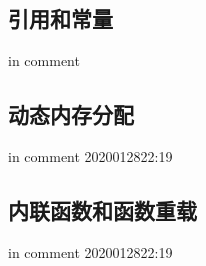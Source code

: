\documentclass[UTF8]{article}
\begin{document}
\subsection{引用和常量}
in comment
\begin{comment}
const int MAX_VAL = 23;
const double Pi = 3.14;
const char * schol_name = "mit";

1）不能通过const指针修改其所指向的内容；
2）常量指针不能赋值给非常量指针，除非强制类型转换(int *),反过来可以。
3）函数中const能防止参数指针指向的地方的数据被修改
void MyPrintf( const char *p){
    strcpy(p," by QR");//编译应该会出错
    printf("%
}

\end{comment}

\subsection{动态内存分配}
in comment
2020012822:19
\begin{comment}

malloc库
P = new T;
T是任意类型名，P是T*的指针，是动态分配出sizeof(T)的内存空间的起始地址。
int *pnew;
pnew = new int;
*pnew = 5;
delete pnew;

P = new T[n];
n是元素个数或者整数表达式
int *p;
int n = 6;
pnew = new int[n * 20];
pnew[0] = 20;
pnew[100] = 30;//编译没问题，运行会数组越界。
delete []pnew;

int *pnew = new int;

delete pnew; // 释放。delete 跟的指针要是一片动态空间
不释放的空间在程序运行期间会一直占用。


int *pnew = new int; *pnew = 5; delete pnew;
int *p_ = new int[6]; *p_[0] = 6; delete [] p_;

\end{comment}



\subsection{内联函数和函数重载}
in comment
2020012822:19
\begin{comment}
减少函数调用的开销，编译时把函数插入到调用语句处。exe文件大
inline int max(int a, int b){
    if (a>b) return a;
    return b;
}
小的函数，调用时和执行过程产生的开销差不多。
函数名相同， 参数个数和类型不同叫参数重载,c++可以名字相同参数类型不同就好
int max(int a, int b){...;}
int max(int a, int b, int c){...;}
int max(double a, double b){...;}
名字和参数表相同的函数即使返回值类型不同也是重定义是错误
\end{comment}
\end{document}
